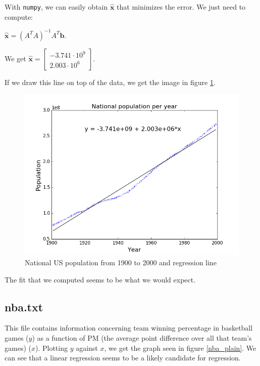 \documentclass[]{article}
\begin{document}
With \texttt{numpy}, we can easily obtain $\widehat{\textbf{x}}$ that minimizes the error. We just need to compute:

$\widehat{\textbf{x}} = (A^TA)^{-1}A^T\textbf{b}$.

We get $\widehat{\textbf{x}} = \left[\begin{smallmatrix}-3.741 \cdot 10^9\\2.003 \cdot 10^6\end{smallmatrix}\right]$.

If we draw this line on top of the data, we get the image in figure \ref{pop_reg}.

\begin{figure}[h]
\centering
\includegraphics{pop_reg.png}
\caption{National US population from 1900 to 2000 and regression line}
\label{pop_reg}
\end{figure}

The fit that we computed seems to be what we would expect.

\newpage
\subsection*{nba.txt}
This file contains information concerning team winning percentage in basketball games ($y$) as a function of PM (the average point difference over all that team's games) ($x$). Plotting $y$ against $x$, we get the graph seen in figure \ref{nba_plain}. We can see that a linear regression seems to be a likely candidate for regression.
\end{document}
